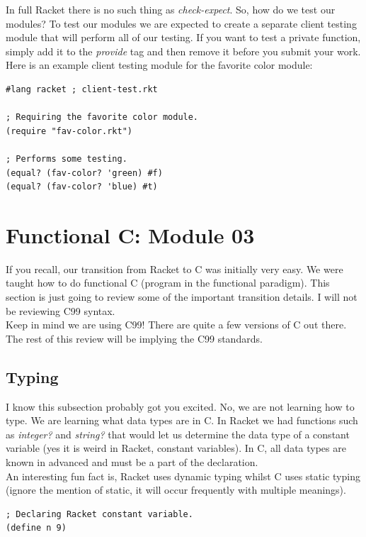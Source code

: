 \documentclass[12pt,extarticle]{article}
\begin{document}
In full Racket there is no such thing as \emph{check-expect}. So, how do we test our modules? To test our modules we are expected to create a separate client testing module that will perform all of our testing. If you want to test a private function, simply add it to the \emph{provide} tag and then remove it before you submit your work. Here is an example client testing module for the favorite color module:\\

\begin{lstlisting}
#lang racket ; client-test.rkt

; Requiring the favorite color module.
(require "fav-color.rkt")

; Performs some testing.
(equal? (fav-color? 'green) #f)
(equal? (fav-color? 'blue) #t)
\end{lstlisting}

\newpage
\section{Functional C: Module 03}
If you recall, our transition from Racket to C was initially very easy. We were taught how to do functional C (program in the functional paradigm). This section is just going to review some of the important transition details. I will not be reviewing C99 syntax.\\

Keep in mind we are using C99! There are quite a few versions of C out there. The rest of this review will be implying the C99 standards.

\subsection{Typing}

I know this subsection probably got you excited. No, we are not learning how to type. We are learning what data types are in C. In Racket we had functions such as \emph{integer?} and \emph{string?} that would let us determine the data type of a constant variable (yes it is weird in Racket, constant variables). In C, all data types are known in advanced and must be a part of the declaration.\\

An interesting fun fact is, Racket uses dynamic typing whilst C uses static typing (ignore the mention of static, it will occur frequently with multiple meanings).\\

\lstset {
	language=Lisp
}
\begin{lstlisting}
; Declaring Racket constant variable.
(define n 9)
\end{lstlisting}
\end{document}
